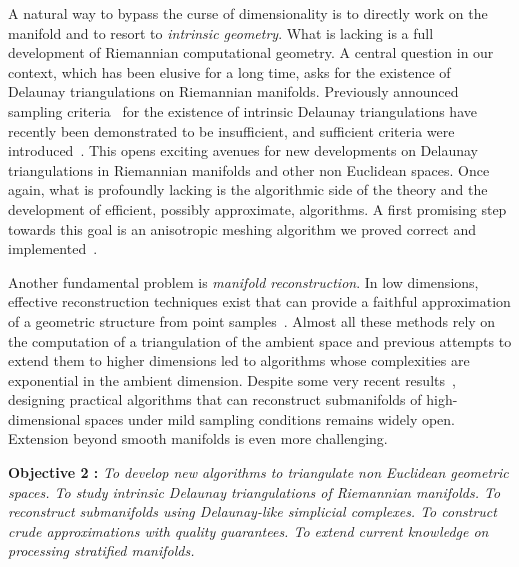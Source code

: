 A natural way to bypass the curse of dimensionality is to directly
work on the manifold and to resort to {\em intrinsic geometry}. What
is lacking is a full development of Riemannian computational
geometry. A central question in our context, which has been elusive
for a long time, asks for the existence of Delaunay triangulations on
Riemannian manifolds. Previously announced sampling
criteria~\cite{leibon2000} for the existence of intrinsic Delaunay
triangulations have recently been demonstrated to be insufficient, and
sufficient criteria were introduced~\cite{boissonnat2012stab}. This opens exciting avenues for new developments on Delaunay triangulations in Riemannian manifolds and other non Euclidean spaces. Once again, what is profoundly lacking is the algorithmic side of the theory and the development of efficient, possibly approximate, algorithms.  A first promising step towards this goal is an anisotropic meshing algorithm we proved correct and implemented~\cite{bwy-luam-08}.


Another fundamental problem is {\em manifold reconstruction}.  In low dimensions, effective reconstruction techniques exist that can provide a faithful approximation of a geometric structure from point samples~\cite{dey-csr-2007}. %
Almost all these methods rely on the computation of a triangulation of the ambient space and previous attempts to extend them to higher dimensions led to algorithms whose complexities are exponential in the ambient dimension.  Despite some very recent results~\cite{geometrica-7142i}, designing practical algorithms that can reconstruct submanifolds of high-dimensional spaces under mild sampling conditions remains widely open. Extension beyond smooth manifolds 
is even more challenging.


\vspace{2mm}

{\bf Objective 2 :}  {\em To   develop new algorithms to {\em  triangulate non Euclidean geometric spaces}. To study intrinsic Delaunay triangulations of Riemannian manifolds.  To reconstruct submanifolds using Delaunay-like simplicial complexes. To construct crude approximations 
with quality guarantees. To extend current knowledge on processing stratified manifolds. }

